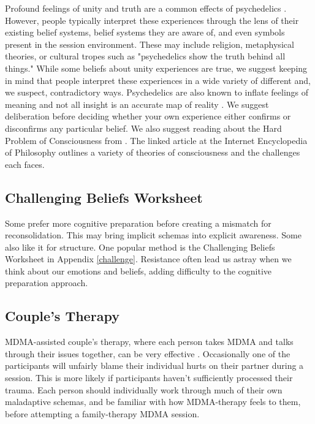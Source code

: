 \documentclass[12pt,letterpaper]{article}
\begin{document}
Profound feelings of unity and truth are a common effects of psychedelics \cite{yaden2022varieties}. However, people typically interpret these experiences through the lens of their existing belief systems, belief systems they are aware of, and even symbols present in the session environment. These may include religion, metaphysical theories, or cultural tropes such as "psychedelics show the truth behind all things." While some beliefs about unity experiences are true, we suggest keeping in mind that people interpret these experiences in a wide variety of different and, we suspect, contradictory ways. Psychedelics are also known to inflate feelings of meaning and not all insight is an accurate map of reality \cite{hartogsohn2018meaning,tulverInsight}. We suggest deliberation before deciding whether your own experience either confirms or disconfirms any particular belief. We also suggest reading about the Hard Problem of Consciousness from \textcite{hardProblem}. The linked article at the Internet Encyclopedia of Philosophy outlines a variety of theories of consciousness and the challenges each faces.
\subsection{Challenging Beliefs Worksheet}
\label{challengingBeliefsWorksheet}
Some prefer more cognitive preparation before creating a mismatch for reconsolidation.  This may bring implicit schemas into explicit awareness. Some also like it for structure. One popular method is the Challenging Beliefs Worksheet in Appendix \ref{challenge}. Resistance often lead us astray when we think about our emotions and beliefs, adding difficulty to the cognitive preparation approach.
\subsection{Couple's Therapy}
MDMA-assisted couple's therapy, where each person takes MDMA and talks through their issues together, can be very effective \cite{colbertEvenings}. Occasionally one of the participants will unfairly blame their individual hurts on their partner during a session. This is more likely if participants haven't sufficiently processed their trauma. Each person should individually work through much of their own maladaptive schemas, and be familiar with how MDMA-therapy feels to them, before attempting a family-therapy MDMA session.
\end{document}
